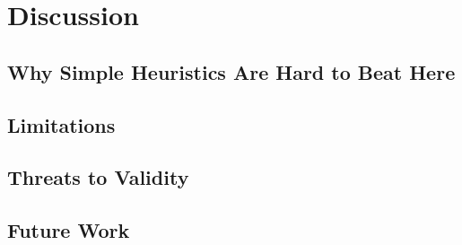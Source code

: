 \section{Discussion}

\subsection{Why Simple Heuristics Are Hard to Beat Here}

\subsection{Limitations}

\subsection{Threats to Validity}

\subsection{Future Work}
